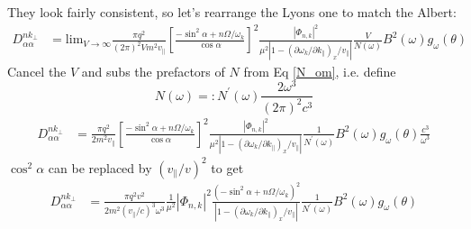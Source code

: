 \documentclass[]{article}
\begin{document}
They look fairly consistent, so let's rearrange the Lyons one to match the Albert:
\begin{align}
D_{\alpha\alpha}^{nk_\perp} &= \mathrm{lim}_{V\rightarrow \infty} \frac{\pi q^2}{(2\pi)^2 V m^2 v_\parallel} \left[ \frac{-\sin^2\alpha + n \Omega/\omega_k}{\cos \alpha}\right]^2 \frac{ |\Phi_{n,k}|^2}{\mu^2 |1-(\partial \omega_k/\partial k_\parallel)_x/v_\parallel|} \frac{V}{N(\omega)}B^2(\omega)g_\omega(\theta)
\end{align}
Cancel the $V$ and subs the prefactors of $N$ from Eq \ref{N_om}, i.e. define
\begin{equation} \label{N_prime} N(\omega) =: N^\prime(\omega) \frac{2\omega^3}{(2\pi)^2 c^3}\end{equation}
\begin{align}
D_{\alpha\alpha}^{nk_\perp} &= \frac{\pi q^2}{2 m^2 v_\parallel} \left[ \frac{-\sin^2\alpha + n \Omega/\omega_k}{\cos \alpha}\right]^2 \frac{ |\Phi_{n,k}|^2}{\mu^2 |1-(\partial \omega_k/\partial k_\parallel)_x/v_\parallel|} \frac{1}{N^\prime(\omega)}B^2(\omega)g_\omega(\theta)\frac{ c^3}{\omega^3}
\end{align}
$\cos^2 \alpha$ can be replaced by $(v_\parallel/v)^2$ to get
\begin{align}\label{LyMid}
D_{\alpha\alpha}^{nk_\perp} &= \frac{\pi q^2 v^2}{2 m^2 (v_\parallel/c)^3 \omega^3} \frac{1}{\mu^2} |\Phi_{n,k}|^2 \frac{ (-\sin^2\alpha + n \Omega/\omega_k)^2}{ |1-(\partial \omega_k/\partial k_\parallel)_x/v_\parallel|} \frac{1}{N^\prime(\omega)}B^2(\omega)g_\omega(\theta)
\end{align}
\end{document}
